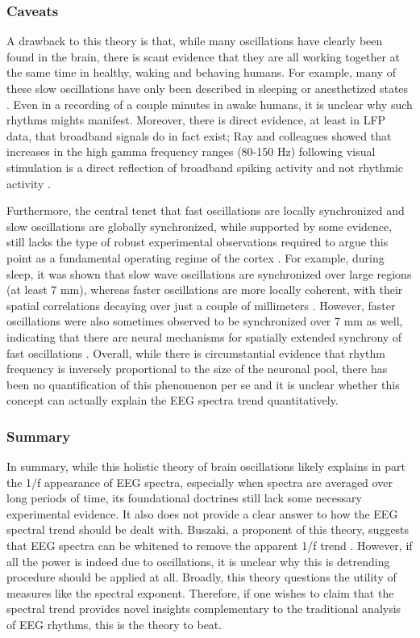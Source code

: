 \subsubsection{Caveats}
A drawback to this theory is that, while many oscillations have clearly been found in the brain, there is scant evidence that they are all working together at the same time in healthy, waking and behaving humans. For example, many of these slow oscillations have only been described in sleeping or anesthetized states \cite{Hromadka2013}. Even in a recording of a couple minutes in awake humans, it is unclear why such rhythms mights manifest. Moreover, there is direct evidence, at least in LFP data, that broadband signals do in fact exist; Ray and colleagues showed that increases in the high gamma frequency ranges (80-150 Hz) following visual stimulation is a direct reflection of broadband spiking activity and not rhythmic activity \cite{Ray2008,Ray2011}. 

Furthermore, the central tenet that fast oscillations are locally synchronized and slow oscillations are globally synchronized, while supported by some evidence, still lacks the type of robust experimental observations required to argue this point as a fundamental operating regime of the cortex \cite{Buzsaki2006}. For example, during sleep, it was shown that slow wave oscillations are synchronized over large regions (at least 7 mm), whereas faster oscillations are more locally coherent, with their spatial correlations decaying over just a couple of millimeters \cite{Destexhe1999}. However, faster oscillations were also sometimes observed to be synchronized over 7 mm as well, indicating that there are neural mechanisms for spatially extended synchrony of fast oscillations \cite{Destexhe1999}. Overall, while there is circumstantial evidence that rhythm frequency is inversely proportional to the size of the neuronal pool, there has been no quantification of this phenomenon per se and it is unclear whether this concept can actually explain the EEG spectra trend quantitatively.

\subsubsection{Summary}
In summary, while this holistic theory of brain oscillations likely explains in part the 1/f appearance of EEG spectra, especially when spectra are averaged over long periods of time, its foundational doctrines still lack some necessary experimental evidence. It also does not provide a clear answer to how the EEG spectral trend should be dealt with. Buszaki, a proponent of this theory, suggests that EEG spectra can be whitened to remove the apparent 1/f trend \cite{Buzsaki2006}. However, if all the power is indeed due to oscillations, it is unclear why this is detrending procedure should be applied at all. Broadly, this theory questions the utility of measures like the spectral exponent. Therefore, if one wishes to claim that the spectral trend provides novel insights complementary to the traditional analysis of EEG rhythms, this is the theory to beat.

